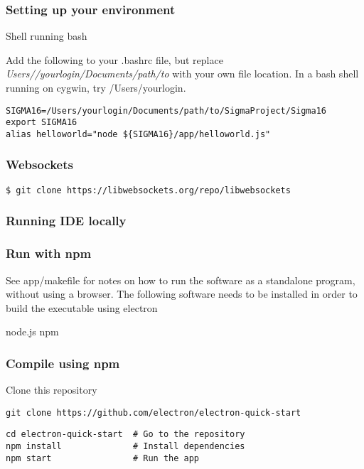\documentclass[11pt]{article}
\begin{document}
\subsubsection*{Setting up your environment}
\label{sec:org3691ac0}

Shell running bash

Add the following to your .bashrc
file, but replace \emph{Users//yourlogin/Documents/path/to} with your own file
location.  In a bash shell running on cygwin, try /Users/yourlogin.

\begin{verbatim}
SIGMA16=/Users/yourlogin/Documents/path/to/SigmaProject/Sigma16
export SIGMA16
alias helloworld="node ${SIGMA16}/app/helloworld.js"
\end{verbatim}

\subsubsection*{Websockets}
\label{sec:orgaf68c5d}

\begin{verbatim}
$ git clone https://libwebsockets.org/repo/libwebsockets
\end{verbatim}

\subsubsection*{Running IDE locally}
\label{sec:org0402c3c}

\subsubsection*{Run with npm}
\label{sec:orge57a6bb}

See app/makefile for notes on how to run the software as a standalone
program, without using a browser.  The following software needs to be
installed in order to build the executable using electron

node.js
npm

\subsubsection*{Compile using npm}
\label{sec:org5bfed55}

Clone this repository
\begin{verbatim}
git clone https://github.com/electron/electron-quick-start
\end{verbatim}

\begin{verbatim}
cd electron-quick-start  # Go to the repository
npm install              # Install dependencies
npm start                # Run the app
\end{verbatim}
\end{document}
